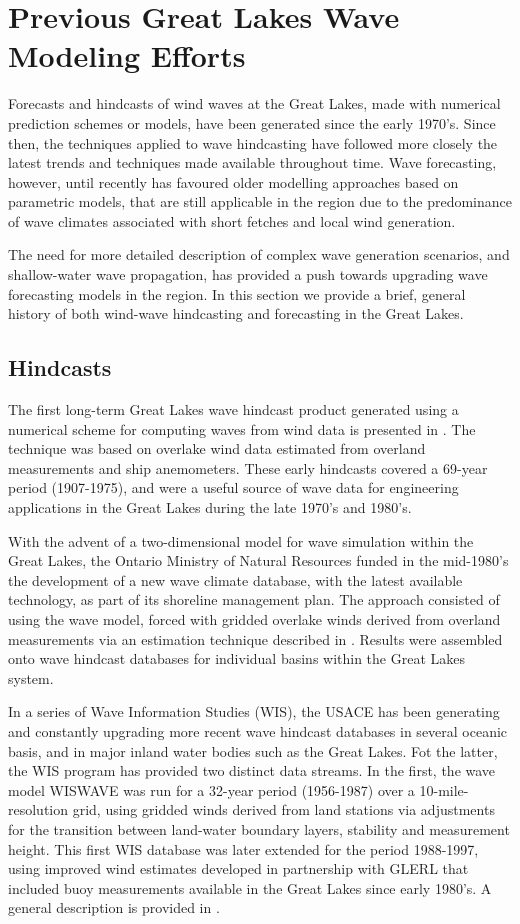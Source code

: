\section{Previous Great Lakes Wave Modeling Efforts}

Forecasts and hindcasts of wind waves at the Great Lakes, made with numerical
prediction schemes or models, have been generated since the early 1970's. Since
then, the techniques applied to wave hindcasting have followed more closely the
latest trends and techniques made available throughout time. Wave forecasting,
however, until recently has favoured older modelling approaches based on
parametric models, that are still applicable in the region due to the
predominance of wave climates associated with short fetches and local wind
generation. 

The need for more detailed description of complex wave generation scenarios, and
shallow-water wave propagation, has provided a push towards upgrading wave
forecasting models in the region. In this section we provide a brief, general
history of both wind-wave hindcasting and forecasting in the Great Lakes. 


\subsection{Hindcasts}

The first long-term Great Lakes wave hindcast product generated using a
numerical scheme for computing waves from wind data is presented in
\cite{resvin76}. The technique was based on overlake wind data estimated from
overland measurements and ship anemometers. These early hindcasts covered a
69-year period (1907-1975), and were a useful source of wave data for
engineering applications in the Great Lakes during the late 1970's and 1980's.

With the advent of a two-dimensional model for wave simulation within the Great
Lakes, the Ontario Ministry of Natural Resources funded in the mid-1980's the
development of a new wave climate database, with the latest available
technology, as part of its shoreline management plan. The approach consisted of
using the \cite{schwet84a} wave model, forced with gridded overlake winds
derived from overland measurements via an estimation technique described in
\cite{philirb78}. Results were assembled onto wave hindcast databases for
individual basins within the Great Lakes system.

In a series of Wave Information Studies (WIS), the USACE has been generating and
constantly upgrading more recent wave hindcast databases in several oceanic
basis, and in major inland water bodies such as the Great Lakes. Fot the latter,
the WIS program has provided two distinct data streams. In the first, the wave
model WISWAVE was run for a 32-year period (1956-1987) over a 10-mile-resolution
grid, using gridded winds derived from land stations via adjustments for the
transition between land-water boundary layers, stability and measurement height.
This first WIS database was later extended for the period 1988-1997, using
improved wind estimates developed in partnership with GLERL that included buoy
measurements available in the Great Lakes since early 1980's. A general
description is provided in \cite{linres01}.

